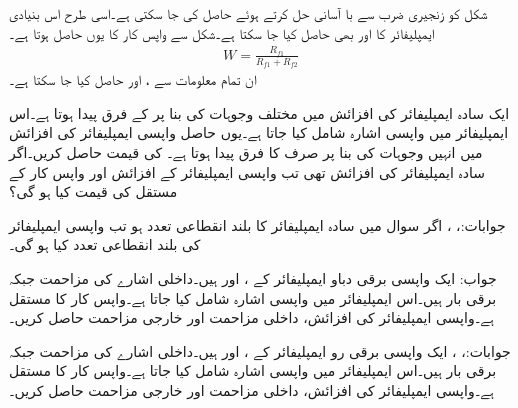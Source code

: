 شکل  کو زنجیری ضرب سے با آسانی حل کرتے ہوئے  حاصل کی جا سکتی ہے۔اسی  طرح اس بنیادی ایمپلیفائر کا  اور  بھی حاصل کیا جا سکتا ہے۔شکل سے واپس کار کا  یوں حاصل ہوتا ہے۔
\begin{align}\label{مساوات_واپسی_زنجیری_ایمپلیفائر}
W=\frac{R_{f1}}{R_{f1}+R_{f2}}
\end{align}
ان تمام معلومات سے ،  اور  حاصل کیا جا سکتا ہے۔

\newpage
{}

ایک سادہ ایمپلیفائر کی افزائش میں مختلف وجوہات کی بنا پر  کے فرق پیدا ہوتا ہے۔اس ایمپلیفائر میں واپسی اشارہ شامل کیا جاتا ہے۔یوں حاصل واپسی ایمپلیفائر کی افزائش میں انہیں وجوہات کی بنا پر صرف  کا فرق پیدا ہوتا ہے۔ کی قیمت حاصل کریں۔اگر سادہ ایمپلیفائر کی افزائش  تھی تب واپسی ایمپلیفائر کے افزائش اور واپس کار کے مستقل   کی قیمت کیا ہو گی؟

جوابات:، ، 
اگر سوال  میں سادہ ایمپلیفائر کا بلند انقطاعی تعدد  ہو تب واپسی ایمپلیفائر کی بلند انقطاعی تعدد کیا ہو گی۔

جواب:
ایک واپسی برقی دباو ایمپلیفائر کے ،  اور  ہیں۔داخلی اشارے کی مزاحمت  جبکہ برقی بار  ہیں۔اس ایمپلیفائر میں واپسی اشارہ شامل کیا جاتا ہے۔واپس کار کا مستقل  ہے۔واپسی ایمپلیفائر کی افزائش، داخلی مزاحمت اور خارجی مزاحمت حاصل کریں۔

جوابات:، ،   
ایک واپسی برقی رو ایمپلیفائر کے ،  اور
  ہیں۔داخلی اشارے کی مزاحمت  جبکہ برقی بار  ہیں۔اس ایمپلیفائر میں واپسی اشارہ شامل کیا جاتا ہے۔واپس کار کا مستقل  ہے۔واپسی ایمپلیفائر کی افزائش، داخلی مزاحمت اور خارجی مزاحمت حاصل کریں۔

